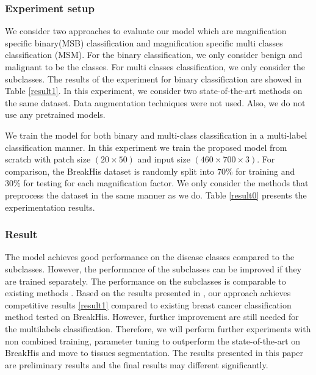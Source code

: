 \documentclass[review]{cvpr}
\begin{document}
\subsubsection{Experiment setup}
We consider two approaches to evaluate our model which are magnification specific binary(MSB) classification  and  magnification specific multi classes classification (MSM). For the binary classification, we only consider benign and malignant to be the classes. For multi classes classification, we only consider the subclasses. The results of the experiment for binary classification are showed in Table \ref{result1}. In this experiment, we consider two state-of-the-art methods \cite{Xie2019,8353225} on the same dataset.  Data augmentation techniques were not used. Also, we do not use any pretrained models.

We  train the model for both binary and multi-class classification in a multi-label classification manner. In this experiment we train the proposed model from scratch with patch size $(20 \times 50)$ and input size $(460\times 700 \times 3)$. For comparison, the BreakHis dataset is randomly split into 70\% for training and 30\% for testing for each magnification factor. We only consider the methods that preprocess the dataset in the same manner as we do. Table \ref{result0} presents the experimentation results.

\subsubsection{Result}
The model achieves good performance on the disease classes compared to the subclasses. However, the performance of the subclasses can be improved if they are trained separately. The performance on the subclasses is comparable to existing methods \cite{BENHAMMOU20209,Xie2019}. Based on the results presented in \cite{BENHAMMOU20209}, our approach achieves competitive results \ref{result1} compared to existing breast cancer classification method tested on BreakHis. However, further improvement are still needed for the multilabels classification. Therefore, we will perform further experiments with non combined training, parameter tuning to outperform the state-of-the-art on BreakHis and move to tissues segmentation. The results presented in this paper are preliminary results and the final results may different significantly. 
\end{document}
